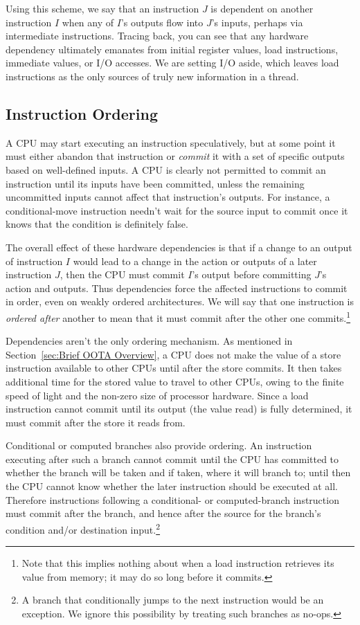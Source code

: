 Using this scheme, we say that an instruction $J$ is dependent on
another instruction $I$ when any of $I$'s outputs flow into $J$'s inputs,
perhaps via intermediate instructions.
Tracing back, you can see that
any hardware dependency ultimately emanates from initial register values,
load instructions, immediate values, or I/O accesses.
We are setting I/O aside, which leaves load instructions as the only sources
of truly new information in a thread.

\subsection{Instruction Ordering}
\label{sec:Instruction Ordering}

A CPU may start executing an instruction speculatively, but at some
point it must either abandon that instruction or \emph{commit} it with
a set of specific outputs based on well-defined inputs.
A CPU is clearly not permitted to commit an instruction until its inputs
have been committed, unless the remaining uncommitted inputs cannot
affect that instruction's outputs.
For instance, a conditional-move instruction needn't wait for the source
input to commit once it knows that the condition is definitely false.

The overall effect of these hardware dependencies is that if a change to an
output of instruction $I$ would lead to a change in the action or outputs of
a later instruction $J$, then the CPU must commit $I$'s output before
committing $J$'s action and outputs.
Thus dependencies force the affected instructions to commit in order,
even on weakly ordered architectures.
We will say that one instruction is \emph{ordered after} another to mean that
it must commit after the other one commits.\footnote{
	Note that this implies nothing about when a load instruction
	retrieves its value from memory; it may do so long before it
	commits.}

Dependencies aren't the only ordering mechanism.
As mentioned in Section~\ref{sec:Brief OOTA Overview}, a CPU does
not make the value of a store instruction available to other CPUs
until after the store commits.
It then takes additional time for the stored value to travel to other
CPUs, owing to the finite speed of light and the non-zero size of
processor hardware.
Since a load instruction cannot commit until its output (the value
read) is fully determined, it must commit after the store it reads
from.

Conditional or computed branches also provide ordering.
An instruction executing after such a branch cannot commit
until the CPU has committed to whether the branch will be taken and
if taken, where it will branch to;
until then the CPU cannot know whether the later instruction should
be executed at all.
Therefore instructions following a conditional- or computed-branch
instruction must commit after the branch, and hence after the source
for the branch's condition and/or destination
input.\footnote{
	A branch that conditionally jumps to the
	next instruction would be an exception.
	We ignore this possibility by treating such branches as no-ops.}

